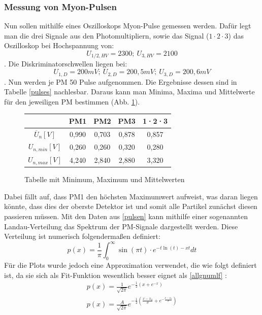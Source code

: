         \subsubsection{Messung von Myon-Pulsen}
            Nun sollen mithilfe eines Oszilloskops Myon-Pulse gemessen werden. Dafür legt man die drei Signale aus den Photomultipliern, sowie das Signal ($1\cdot 2 \cdot 3$) das Oszilloskop bei Hochspannung von: $$ U_{1/2,HV} = 2300;\ U_{3,HV} = 2100 $$. Die Diskriminatorschwellen liegen bei: $$ U_{1,D} = 200\unit{mV};\ U_{2,D} = 200,5\unit{mV};\ U_{3,D} = 200,6\unit{mV} $$. Nun werden je PM 50 Pulse aufgenommen. Die Ergebnisse dessen sind in Tabelle \ref{pulses} nachlesbar. Daraus kann man Minima, Maxima und Mittelwerte für den jeweiligen PM bestimmen (Abb. \ref{MWs}).
            \begin{figure}[htbp]
                \centering
                \begin{tabular}{c||c|c|c|c}
                                                & PM1   & PM2   & PM3 & 1·2·3\\
                       \hline $\overline U_{n}  [\unit{V}]$  & 0,990 & 0,703 & 0,878 & 0,857\\
                                       $U_{n,min} [\unit{V}]$& 0,260 & 0,260 & 0,320 & 0,280\\
                                       $U_{n,max} [\unit{V}]$& 4,240 & 2,840 & 2,880 & 3,320\\ 
                \end{tabular}
                \caption{Tabelle mit Minimum, Maximum und Mittelwerten}
                \label{MWs}
            \end{figure}
            Dabei fällt auf, dass PM1 den höchsten Maximumwert aufweist, was daran liegen könnte, dass dies der oberste Detektor ist und somit alle Partikel zunächst diesen passieren müssen. 
            Mit den Daten aus \ref{pulsen} kann mithilfe einer sogenannten Landau-Verteilung das Spektrum der PM-Signale dargestellt werden. Diese Verteilung ist numerisch folgendermaßen definiert:
            \begin{equation}
                p(x) = \frac{1}{\pi} \int_{0}^{\infty} \sin(\pi t)\cdot e^{-t\ln(t)-xt} dt
                \label{allgnumlf}
            \end{equation}
            Für die Plots wurde jedoch eine Approximation verwendet, die wie folgt definiert ist, da sie sich als Fit-Funktion wesentlich besser eignet als \ref{allgnumlf} :
            \begin{eqnarray}
                p(x) = \frac{1}{\sqrt{2\pi}}e^{-\frac{1}{2}\left(x+e^{-x}\right)}\\                
                p(x) = \frac{A}{\sqrt{2\pi}}e^{-\frac{1}{2}\left(\frac{x-x_0}{\sigma}+e^{-\frac{x-x_0}{\sigma}}\right)}
                \label{qtilandaufitfunktion}
            \end{eqnarray}
